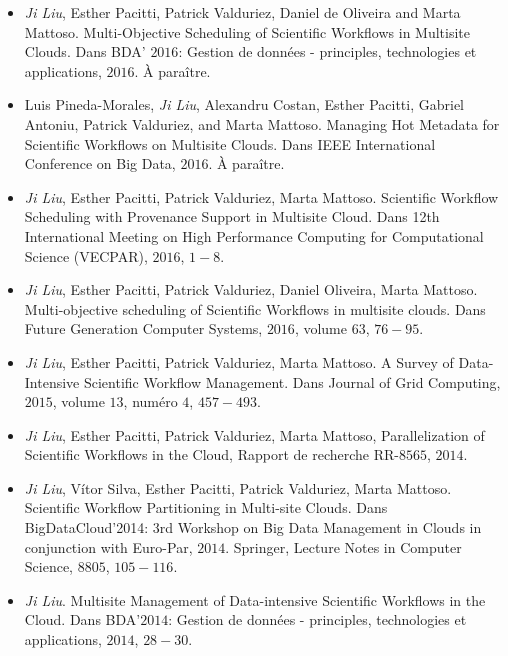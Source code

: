 \begin{itemize}

\item \textit{Ji Liu}, Esther Pacitti, Patrick Valduriez, Daniel de Oliveira and Marta Mattoso. Multi-Objective Scheduling of Scientific Workflows in Multisite Clouds. Dans BDA’ $2016$: Gestion de données - principles, technologies et applications, $2016$. À paraître.

\item Luis Pineda-Morales, \textit{Ji Liu}, Alexandru Costan, Esther Pacitti, Gabriel Antoniu, Patrick Valduriez, and Marta Mattoso. Managing Hot Metadata for Scientific Workflows on Multisite Clouds. Dans IEEE International Conference on Big Data, $2016$. À paraître.

\item \textit{Ji Liu}, Esther Pacitti, Patrick Valduriez, Marta Mattoso. Scientific Workflow Scheduling with Provenance Support in Multisite Cloud. Dans 12th International Meeting on High Performance Computing for Computational Science (VECPAR), $2016$, $1-8$.

\item \textit{Ji Liu}, Esther Pacitti, Patrick Valduriez, Daniel Oliveira, Marta Mattoso. Multi-objective scheduling of Scientific Workflows in multisite clouds. Dans Future Generation Computer Systems, $2016$, volume $63$, $76-95$.

\item \textit{Ji Liu}, Esther Pacitti, Patrick Valduriez, Marta Mattoso. A Survey of Data-Intensive Scientific Workflow Management. Dans Journal of Grid Computing, $2015$, volume $13$, numéro $4$, $457-493$.

\item \textit{Ji Liu}, Esther Pacitti, Patrick Valduriez, Marta Mattoso, Parallelization of Scientific Workflows in the Cloud, Rapport de recherche RR-$8565$, $2014$.

\item \textit{Ji Liu}, V\'{i}tor Silva, Esther Pacitti, Patrick Valduriez, Marta Mattoso. Scientific Workflow Partitioning in Multi-site Clouds. Dans BigDataCloud'2014: 3rd Workshop on Big Data Management in Clouds in conjunction with Euro-Par, $2014$. Springer, Lecture Notes in Computer Science, $8805$,  $105-116$.

\item \textit{Ji Liu}. Multisite Management of Data-intensive Scientific Workflows in the Cloud. Dans BDA’$2014$: Gestion de données - principles, technologies et applications, $2014$, $28-30$.

\end{itemize}
